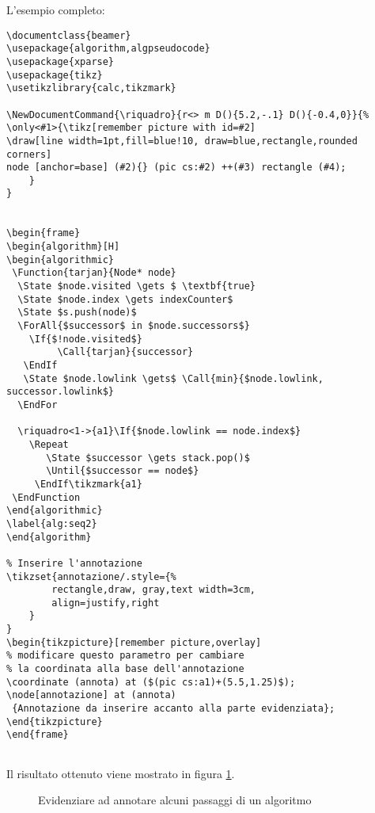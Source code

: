 L'esempio completo:
\begin{lstlisting}[frame=lines]
\documentclass{beamer}
\usepackage{algorithm,algpseudocode}
\usepackage{xparse}
\usepackage{tikz}
\usetikzlibrary{calc,tikzmark}

\NewDocumentCommand{\riquadro}{r<> m D(){5.2,-.1} D(){-0.4,0}}{%
\only<#1>{\tikz[remember picture with id=#2]
\draw[line width=1pt,fill=blue!10, draw=blue,rectangle,rounded corners]
node [anchor=base] (#2){} (pic cs:#2) ++(#3) rectangle (#4);
	}
}


\begin{frame}
\begin{algorithm}[H]
\begin{algorithmic}
 \Function{tarjan}{Node* node}        
  \State $node.visited \gets $ \textbf{true}
  \State $node.index \gets indexCounter$
  \State $s.push(node)$
  \ForAll{$successor$ in $node.successors$}
    \If{$!node.visited$}
         \Call{tarjan}{successor}
   \EndIf
   \State $node.lowlink \gets$ \Call{min}{$node.lowlink, successor.lowlink$}
  \EndFor
            
  \riquadro<1->{a1}\If{$node.lowlink == node.index$}
    \Repeat 
       \State $successor \gets stack.pop()$
       \Until{$successor == node$}
     \EndIf\tikzmark{a1}
 \EndFunction
\end{algorithmic}
\label{alg:seq2}
\end{algorithm}

% Inserire l'annotazione
\tikzset{annotazione/.style={%
		rectangle,draw, gray,text width=3cm,
		align=justify,right
	}
}
\begin{tikzpicture}[remember picture,overlay]
% modificare questo parametro per cambiare 
% la coordinata alla base dell'annotazione
\coordinate (annota) at ($(pic cs:a1)+(5.5,1.25)$); 
\node[annotazione] at (annota) 
 {Annotazione da inserire accanto alla parte evidenziata};
\end{tikzpicture}
\end{frame}


\end{lstlisting}

Il risultato ottenuto viene mostrato in figura \ref{fig:evidenziaannotazione}.

\begin{figure}[ht]
\centering
{}
\caption{Evidenziare ad annotare alcuni passaggi di un algoritmo}
\label{fig:evidenziaannotazione}
\end{figure}